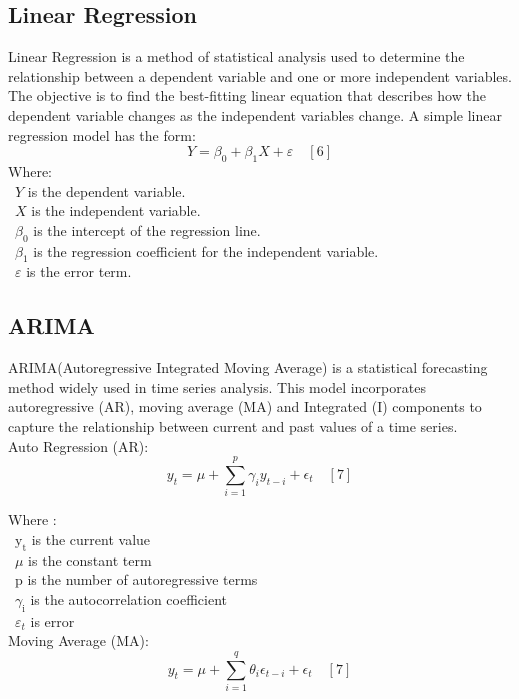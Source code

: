\documentclass{ieeeojies}
\begin{document}
\subsection{Linear Regression}
Linear Regression is a method of statistical analysis used to determine the relationship between a dependent variable and one or more independent variables. The objective is to find the best-fitting linear equation that describes how the dependent variable changes as the independent variables change.
A simple linear regression model has the form: 
\[Y=\beta_0+\beta_1X+\varepsilon \quad[6]\]
Where:\\
	\indent\textbullet\ \(Y\) is the dependent variable.\\
	\indent\textbullet\ \(X\) is the independent variable.\\
	\indent\textbullet\ \(\beta_0\) is the intercept of the regression line.\\
	\indent\textbullet\ \(\beta_1\) is the regression coefficient for the independent variable.\\
	\indent\textbullet\ \(\varepsilon\) is the error term.
 \subsection{ARIMA}
 ARIMA(Autoregressive Integrated Moving Average) is a statistical forecasting method widely used in time series analysis. This model incorporates autoregressive (AR), moving average (MA) and Integrated (I) components to capture the relationship between current and past values of a time series.\\
Auto Regression (AR): 
$$
y_t=\mu+\sum_{i=1}^p \gamma_i y_{t-i}+\epsilon_t \quad [7]
$$

Where :\\
\indent\textbullet\ \(\mathrm{y}_{\mathrm{t}}\) is the current value \\ 
\indent\textbullet\ \(\mu\) is the constant term \\ 
\indent\textbullet\ \(\mathrm{p}\) is the number of autoregressive terms \\ 
\indent\textbullet\ \(\gamma_{\mathrm{i}}\) is the autocorrelation coefficient \\ 
\indent\textbullet\ \(\varepsilon_{t}\) is error \\
Moving Average (MA):
$$
y_t=\mu+\sum_{i=1}^q \theta_i \epsilon_{t-i}+\epsilon_t \quad [7]
$$
\end{document}
